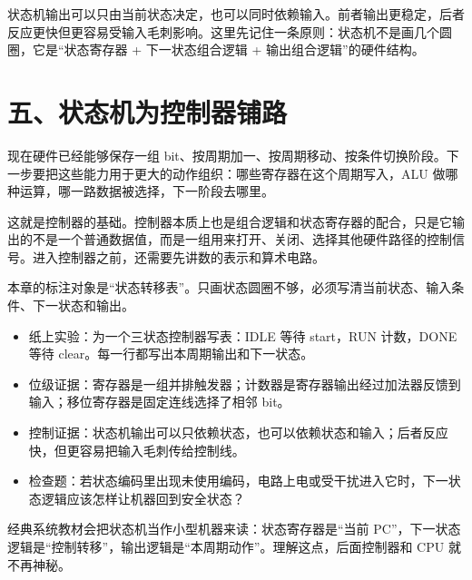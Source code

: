 状态机输出可以只由当前状态决定，也可以同时依赖输入。前者输出更稳定，后者反应更快但更容易受输入毛刺影响。这里先记住一条原则：状态机不是画几个圆圈，它是“状态寄存器 + 下一状态组合逻辑 + 输出组合逻辑”的硬件结构。

\section{五、状态机为控制器铺路}

现在硬件已经能够保存一组 bit、按周期加一、按周期移动、按条件切换阶段。下一步要把这些能力用于更大的动作组织：哪些寄存器在这个周期写入，ALU 做哪种运算，哪一路数据被选择，下一阶段去哪里。

这就是控制器的基础。控制器本质上也是组合逻辑和状态寄存器的配合，只是它输出的不是一个普通数据值，而是一组用来打开、关闭、选择其他硬件路径的控制信号。进入控制器之前，还需要先讲数的表示和算术电路。

\begin{classicnote}
本章的标注对象是“状态转移表”。只画状态圆圈不够，必须写清当前状态、输入条件、下一状态和输出。

\begin{itemize}
\item 纸上实验：为一个三状态控制器写表：IDLE 等待 start，RUN 计数，DONE 等待 clear。每一行都写出本周期输出和下一状态。
\item 位级证据：寄存器是一组并排触发器；计数器是寄存器输出经过加法器反馈到输入；移位寄存器是固定连线选择了相邻 bit。
\item 控制证据：状态机输出可以只依赖状态，也可以依赖状态和输入；后者反应快，但更容易把输入毛刺传给控制线。
\item 检查题：若状态编码里出现未使用编码，电路上电或受干扰进入它时，下一状态逻辑应该怎样让机器回到安全状态？
\end{itemize}

经典系统教材会把状态机当作小型机器来读：状态寄存器是“当前 PC”，下一状态逻辑是“控制转移”，输出逻辑是“本周期动作”。理解这点，后面控制器和 CPU 就不再神秘。
\end{classicnote}
